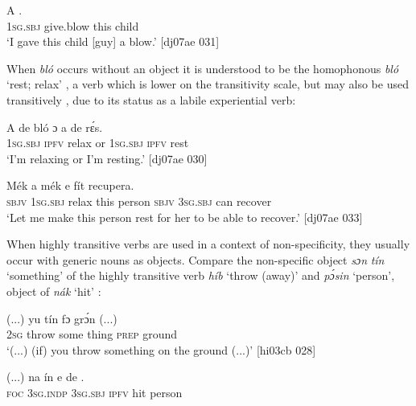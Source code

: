 \ea%
    \label{ex:key:1272}
    \gll A            .\\
\textsc{1sg.sbj}  give.blow  this  child\\

\glt ‘I gave this child [guy] a blow.’ [dj07ae 031]
\z

When \textit{bló} occurs without an object it is understood to be the homophonous \textit{bló} ‘rest; relax’ , a verb which is lower on the transitivity scale, but may also be used transitively , due to its status as a labile experiential verb: 


\ea%
    \label{ex:key:1273}
    \gll A    de  bló    ɔ  a    de  rɛ́s.\\
\textsc{1sg.sbj}  \textsc{ipfv}  relax  or  \textsc{1sg.sbj}  \textsc{ipfv}  rest\\

\glt ‘I’m relaxing or I’m resting.’ [dj07ae 030]
\z


\ea%
    \label{ex:key:1274}
    \gll Mék    a            mék    e    fít  recupera.\\
\textsc{sbjv}    \textsc{1sg.sbj}  relax  this  person  \textsc{sbjv}    \textsc{3sg.sbj}  can  recover\\

\glt ‘Let me make this person rest for her to be able to recover.’ [dj07ae 033]
\z

When highly transitive verbs are used in a context of non-specificity, they usually occur with generic nouns as objects. Compare the non-specific object \textit{sɔn} \textit{tín} ‘something’ of the highly transitive verb \textit{híb} ‘throw (away)’  and \textit{pɔ́sin} ‘person’, object of \textit{nák} ‘hit’ : 


\ea%
    \label{ex:key:1275}
    \gll (...)  yu         tín    fɔ  grɔ́n    (...)\\
  {} \textsc{2sg}  throw  some  thing  \textsc{prep}  ground\\

\glt ‘(...) (if) you throw something on the ground (...)’ [hi03cb 028]
\z


\ea%
    \label{ex:key:1276}
    \gll (...)  na  ín    e    de    .\\
  {} \textsc{foc}  \textsc{3sg.indp}  \textsc{3sg.sbj}  \textsc{ipfv}  hit  person\\

